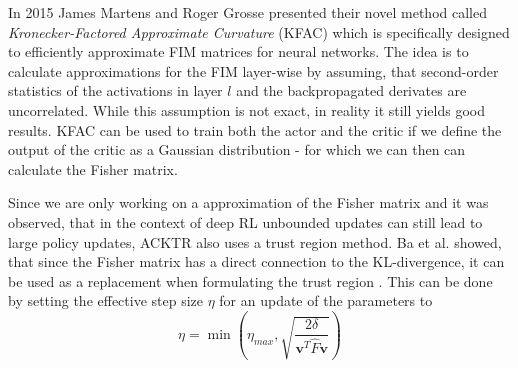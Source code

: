 In 2015 James Martens and Roger Grosse presented their novel method called \textit{Kronecker-Factored Approximate Curvature} (KFAC) \cite{martens2015optimizing} which is specifically designed to efficiently approximate FIM matrices for neural networks. The idea is to calculate approximations for the FIM layer-wise by assuming, that second-order statistics of the activations in layer $l$ and the backpropagated derivates are uncorrelated. While this assumption is not exact, in reality it still yields good results. KFAC can be used to train both the actor and the critic if we define the output of the critic as a Gaussian distribution - for which we can then can calculate the Fisher matrix. 



Since we are only working on a approximation of the Fisher matrix and it was observed, that in the context of deep RL unbounded updates can still lead to large policy updates, ACKTR also uses a trust region method. Ba et al. showed, that since the Fisher matrix has a direct connection to the KL-divergence, it can be used as a replacement when formulating the trust region \cite{ba2016distributed}. This can be done by setting the effective step size $\eta$ for an update of the parameters to 
\[\eta = \min\left(\eta_{max}, \sqrt{\frac{2\delta}{\mathbf{v}^T\hat{F}\mathbf{v}}}\right)\]

